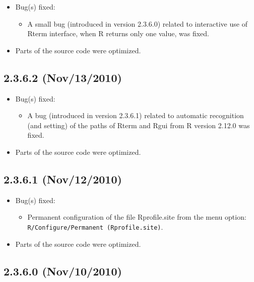 \begin{itemize}
  \item Bug(s) fixed:
    \begin{itemize}
      \item A small bug (introduced in version 2.3.6.0) related to interactive use of Rterm interface,
        when R returns only one value, was fixed.
    \end{itemize}
  \item Parts of the source code were optimized.
\end{itemize}

\subsection{2.3.6.2 (Nov/13/2010)}

\begin{itemize}
  \item Bug(s) fixed:
    \begin{itemize}
      \item A bug (introduced in version 2.3.6.1) related to automatic recognition (and setting) of the paths
        of Rterm and Rgui from R version 2.12.0 was fixed.
    \end{itemize}
  \item Parts of the source code were optimized.
\end{itemize}

\subsection{2.3.6.1 (Nov/12/2010)}

\begin{itemize}
  \item Bug(s) fixed:
    \begin{itemize}
      \item Permanent configuration of the file Rprofile.site from the menu option: \texttt{R/Configure/Permanent (Rprofile.site)}.
    \end{itemize}
  \item Parts of the source code were optimized.
\end{itemize}

\subsection{2.3.6.0 (Nov/10/2010)}

